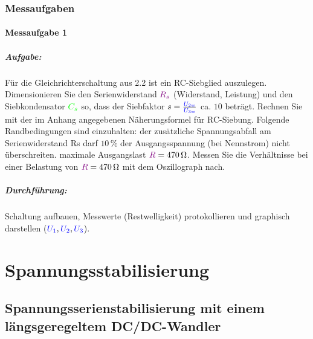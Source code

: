\documentclass[11pt,a4paper,titlepage]{scrreprt}
\newcommand{\spannung}[1]{\textcolor{blue}{#1}}
\newcommand{\widerstand}[1]{\textcolor{violet}{#1}}
\newcommand{\capacity}[1]{\textcolor{green}{#1}}
\begin{document}
            \subsection{Messaufgaben}
            \subsubsection{Messaufgabe 1}
            \paragraph{Aufgabe:}  Für die Gleichrichterschaltung aus 2.2 ist ein RC-Siebglied auszulegen. Dimensionieren Sie den Serienwiderstand $\widerstand{R_s}$ (Widerstand, Leistung) und den Siebkondensator $\capacity{C_s}$ so, dass der Siebfaktor $s = \frac{\spannung{U_{2w}}}{\spannung{U_{3w}}}$ ca. $10$ beträgt. Rechnen Sie mit der im Anhang angegebenen Näherungsformel für RC-Siebung. Folgende Randbedingungen sind einzuhalten: der zusätzliche Spannungsabfall am Serienwiderstand Rs darf $10\,\%$ der Ausgangsspannung (bei Nennstrom) nicht überschreiten. maximale Ausgangslast $\widerstand{R} = \SI{470}{\ohm}$. Messen Sie die Verhältnisse bei einer Belastung von $\widerstand{R} = \SI{470}{\ohm}$ mit dem Oszillograph nach.
            \paragraph{Durchführung: } Schaltung aufbauen, Messwerte (Restwelligkeit) protokollieren und graphisch darstellen ($\spannung{U_1}, \spannung{U_2}, \spannung{U_3} $).
            
        
    \chapter{Spannungsstabilisierung}
        \section{Spannungsserienstabilisierung mit einem längsgeregeltem DC/DC-Wandler}
\end{document}
